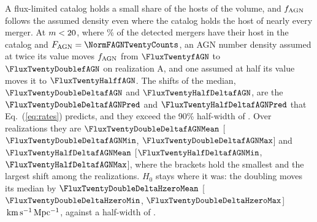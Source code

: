 \documentclass[aps,prd,reprint,twocolumn,superscriptaddress,nofootinbib,floatfix,nolongbibliography]{revtex4-2}
\newcommand{\kms}{{\rm km\,s^{-1}\,Mpc^{-1}}}
\newcommand{\fagn}{f_{\rm AGN}}
\begin{document}
A flux-limited catalog holds a small share of the hosts of the volume, and
$\fagn$ follows the assumed density even where the catalog holds the host
of nearly every merger. At $m<20$, where
\MockEventCompTwenty\% of the detected mergers have their host in the
catalog and $F_{\rm AGN}=\NormFAGNTwentyCounts$, an AGN number density
assumed at twice its value moves $\fagn$ from $\FluxTwentyfAGN$ to
$\FluxTwentyDoublefAGN$ on realization A, and one assumed at half its value
moves it to $\FluxTwentyHalffAGN$. The shifts of the median,
$\FluxTwentyDoubleDeltafAGN$ and $\FluxTwentyHalfDeltafAGN$, are the
$\FluxTwentyDoubleDeltafAGNPred$ and $\FluxTwentyHalfDeltafAGNPred$ that
Eq.~(\ref{eq:rates}) predicts, and they exceed the 90\% half-width of
\FluxTwentyfAGNHalfWid. Over \NrealFluxDensity{} realizations they are
$\FluxTwentyDoubleDeltafAGNMean$ [$\FluxTwentyDoubleDeltafAGNMin$,
$\FluxTwentyDoubleDeltafAGNMax$] and $\FluxTwentyHalfDeltafAGNMean$
[$\FluxTwentyHalfDeltafAGNMin$, $\FluxTwentyHalfDeltafAGNMax$], where the
brackets hold the smallest and the largest shift among the realizations.
$H_0$ stays where it was: the doubling moves its median by
$\FluxTwentyDoubleDeltaHzeroMean$ [$\FluxTwentyDoubleDeltaHzeroMin$,
$\FluxTwentyDoubleDeltaHzeroMax$]$\,\kms$, against a half-width of
\FluxTwentyHzeroHalfWid.
\end{document}
